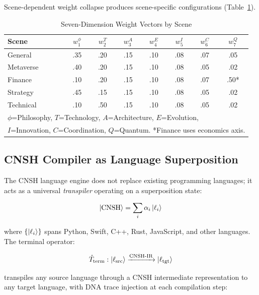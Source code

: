\documentclass[conference]{IEEEtran}
\begin{document}
Scene-dependent weight collapse produces scene-specific
configurations (Table~\ref{tab:weights}).

\begin{table}[!ht]
\caption{Seven-Dimension Weight Vectors by Scene}
\label{tab:weights}
\centering
\small
\begin{tabular}{lccccccc}
\toprule
\textbf{Scene}
  & $w_1^{\phi}$ & $w_2^{T}$ & $w_3^{A}$
  & $w_4^{E}$ & $w_5^{I}$ & $w_6^{C}$ & $w_7^{Q}$ \\
\midrule
General    & .35 & .20 & .15 & .10 & .08 & .07 & .05 \\
Metaverse  & .40 & .20 & .15 & .10 & .08 & .05 & .02 \\
Finance    & .10 & .20 & .15 & .10 & .08 & .07 & .50* \\
Strategy   & .45 & .15 & .15 & .10 & .08 & .05 & .02 \\
Technical  & .10 & .50 & .15 & .10 & .08 & .05 & .02 \\
\bottomrule
\multicolumn{8}{l}{\scriptsize $\phi$=Philosophy, $T$=Technology,
$A$=Architecture, $E$=Evolution,} \\
\multicolumn{8}{l}{\scriptsize $I$=Innovation, $C$=Coordination,
$Q$=Quantum. *Finance uses economics axis.}
\end{tabular}
\end{table}

\subsection{CNSH Compiler as Language Superposition}

The CNSH language engine does not replace existing
programming languages; it acts as a universal
\textit{transpiler} operating on a superposition state:

\begin{equation}
  \ket{\text{CNSH}} = \sum_{i} \alpha_i \ket{\ell_i}
  \label{eq:cnsh_super}
\end{equation}

where $\{\ket{\ell_i}\}$ spans Python, Swift, C++,
Rust, JavaScript, and other languages. The terminal
operator:

\begin{equation}
  \hat{T}_{\text{term}} : \ket{\ell_{\text{src}}}
  \xrightarrow{\text{CNSH-IR}} \ket{\ell_{\text{tgt}}}
  \label{eq:transpile}
\end{equation}

transpiles any source language through a CNSH
intermediate representation to any target language,
with DNA trace injection at each compilation step:
\end{document}
